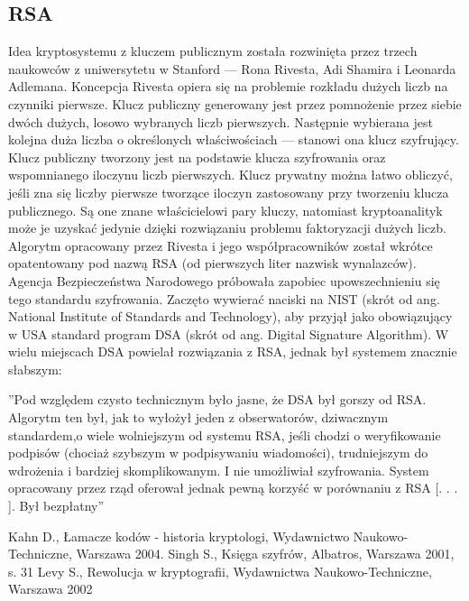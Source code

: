 \documentclass[a4paper, 10pt] {article}
\begin{document}
\subsection{RSA}
Idea kryptosystemu z kluczem publicznym została rozwinięta przez trzech naukowców z uniwersytetu w Stanford — Rona Rivesta, Adi Shamira i Leonarda Adlemana. Koncepcja Rivesta opiera
się na problemie rozkładu dużych liczb na czynniki pierwsze. Klucz publiczny generowany jest
przez pomnożenie przez siebie dwóch dużych, losowo wybranych liczb pierwszych. Następnie wybierana jest kolejna duża liczba o określonych właściwościach — stanowi ona klucz szyfrujący.
Klucz publiczny tworzony jest na podstawie klucza szyfrowania oraz wspomnianego iloczynu liczb
pierwszych. Klucz prywatny można łatwo obliczyć, jeśli zna się liczby pierwsze tworzące iloczyn
zastosowany przy tworzeniu klucza publicznego. Są one znane właścicielowi pary kluczy, natomiast
kryptoanalityk może je uzyskać jedynie dzięki rozwiązaniu problemu faktoryzacji dużych liczb.
Algorytm opracowany przez Rivesta i jego współpracowników został wkrótce opatentowany pod
nazwą RSA (od pierwszych liter nazwisk wynalazców). Agencja Bezpieczeństwa Narodowego próbowała zapobiec upowszechnieniu się tego standardu szyfrowania. Zaczęto wywierać naciski na
NIST (skrót od ang. National Institute of Standards and Technology), aby przyjął jako obowiązujący w USA standard program DSA (skrót od ang. Digital Signature Algorithm).
W wielu miejscach DSA powielał rozwiązania z RSA, jednak był systemem znacznie słabszym:
\begin{center}
”Pod względem czysto technicznym było jasne, że DSA był gorszy od RSA. Algorytm ten był,
jak to wyłożył jeden z obserwatorów, dziwacznym standardem,o wiele wolniejszym od systemu
RSA, jeśli chodzi o weryfikowanie podpisów (chociaż szybszym w podpisywaniu wiadomości),
trudniejszym do wdrożenia i bardziej skomplikowanym. I nie umożliwiał szyfrowania. System
opracowany przez rząd oferował jednak pewną korzyść w porównaniu z RSA [. . . ]. Był
bezpłatny” \cite{latexdps3}

\end{center}
\begin{thebibliography}{9}
Kahn D.,
\textit{}
Łamacze kodów - historia kryptologi, Wydawnictwo Naukowo-Techniczne, Warszawa
2004.
Singh S.,
\textit{}
Księga szyfrów, Albatros, Warszawa 2001, s. 31
Levy S.,
\textit{}
Rewolucja w kryptografii, Wydawnictwa Naukowo-Techniczne, Warszawa 2002
\end{thebibliography}
\end{document}

